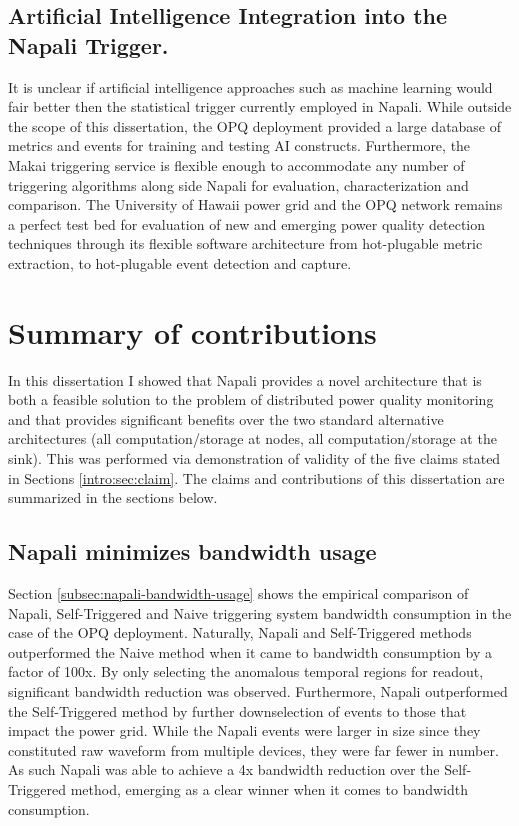 \subsection{Artificial Intelligence Integration into the Napali Trigger.}\label{subsec:artafitial-inteligence-integration-into-the-napali-trigger.}
It is unclear if artificial intelligence approaches such as machine learning would fair better then the statistical trigger currently employed in Napali.
While outside the scope of this dissertation, the OPQ deployment provided a large database of metrics and events for training and testing AI constructs.
Furthermore, the Makai triggering service is flexible enough to accommodate any number of triggering algorithms along side Napali for evaluation, characterization and comparison.
The University of Hawaii power grid and the OPQ network remains a perfect test bed for evaluation of new and emerging power quality detection
techniques through its flexible software architecture from hot-plugable metric extraction, to hot-plugable event detection and capture.

\section{Summary of contributions}\label{sec:conclusions}

In this dissertation I showed that Napali provides a novel architecture that is both a feasible solution to the problem of distributed power quality monitoring and that provides significant benefits over the two standard alternative architectures (all computation/storage at nodes, all computation/storage at the sink).
This was performed via demonstration of validity of the five claims stated in Sections \ref{intro:sec:claim}.
The claims and contributions of this dissertation are summarized in the sections below.

\subsection{Napali minimizes bandwidth usage}\label{subsec:conc:napali-minimizes-bandwidth-usage}
Section \ref{subsec:napali-bandwidth-usage} shows the empirical comparison of Napali, Self-Triggered and Naive triggering system bandwidth consumption in the case of the OPQ deployment.
Naturally, Napali and Self-Triggered methods outperformed the Naive method when it came to bandwidth consumption by a factor of 100x.
By only selecting the anomalous temporal regions for readout, significant bandwidth reduction was observed.
Furthermore, Napali outperformed the Self-Triggered method by further downselection of events to those that impact the power grid.
While the Napali events were larger in size since they constituted raw waveform from multiple devices, they were far fewer in number.
As such Napali was able to achieve a 4x bandwidth reduction over the Self-Triggered method, emerging as a clear winner when it comes to bandwidth consumption.

